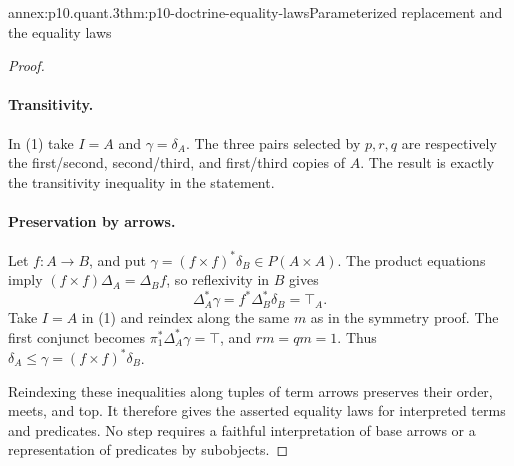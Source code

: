 \begin{annexitem}{annex:p10.quant.3}{thm:p10-doctrine-equality-laws}{Parameterized replacement and the equality laws}
\begin{proof}
\paragraph{Transitivity.}
In (1) take \(I=A\) and \(\gamma=\delta_A\).
The three pairs selected by \(p,r,q\) are respectively
the first/second, second/third, and first/third copies of \(A\).
The result is exactly the transitivity inequality in the statement.

\paragraph{Preservation by arrows.}
Let \(f:A\to B\), and put
\(\gamma=(f\times f)^*\delta_B\in P(A\times A)\).
The product equations imply
\((f\times f)\Delta_A=\Delta_B f\), so reflexivity in \(B\)
gives
\[
                         \Delta_A^*\gamma
                               =f^*\Delta_B^*\delta_B=\top_A.
\]
Take \(I=A\) in (1) and reindex along the same \(m\)
as in the symmetry proof.  The first conjunct becomes
\(\pi_1^*\Delta_A^*\gamma=\top\), and \(r m=q m=1\).
Thus \(\delta_A\leq\gamma=(f\times f)^*\delta_B\).

Reindexing these inequalities along tuples of term arrows
preserves their order, meets, and top.  It therefore gives
the asserted equality laws for interpreted terms and predicates.
No step requires a faithful interpretation of base arrows or
a representation of predicates by subobjects.
\end{proof}
\end{annexitem}

